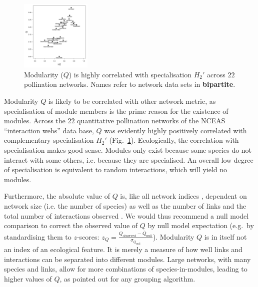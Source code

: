 \documentclass[a4paper, 11pt]{article}
\newcommand{\package}[1]{\textbf{#1}}
\begin{document}
\begin{figure}
	\vspace*{-.5cm}
	\includegraphics[width=0.3\textwidth]{figures/poll_mod_QvsH2}
	\caption{Modularity ($Q$) is highly correlated with specialisation $H_2'$ across $22$ pollination networks. Names refer to network data sets in \package{bipartite}.}
\label{fig:QvsH2}
\end{figure}
%
Modularity $Q$ is likely to be correlated with other network metric, as specialisation of module members is the prime reason for the existence of modules. Across the $22$ quantitative pollination networks of the NCEAS ``interaction webs'' data base,%
 $Q$ was evidently highly positively correlated with complementary specialisation $H_2'$ (Fig.~\ref{fig:QvsH2}).
Ecologically, the correlation with specialisation makes good sense. Modules only exist because some species do not interact with some others, i.e. because they are specialised. An overall low degree of specialisation is equivalent to random interactions, which will yield no modules. %

Furthermore, the absolute value of $Q$  is, like all network indices \citep{Dormann2009}, dependent on network size (i.e. the number of species) as well as the number of links and the total number of interactions observed \citep{Thebault2013}. We would thus recommend a null model comparison \citep{Vazquez2003a,Bluthgen2008,Dormann2009} to correct the observed value of $Q$ by null model expectation (e.g.~by standardising them to $z$-scores:
$z_{Q} = \frac{Q_{\text{observed}} - \overline{Q}_{\text{null}}}{\sigma_{Q_{\text{null}}}}$).
%
Modularity $Q$ is in itself not an index of an ecological feature. It is merely a measure of how well links and interactions can be separated into different modules. Large networks, with many species and links, allow for more combinations of species-in-modules, leading to higher values of $Q$, as \citet{Allesina2009a} pointed out for any grouping algorithm. %
\end{document}
